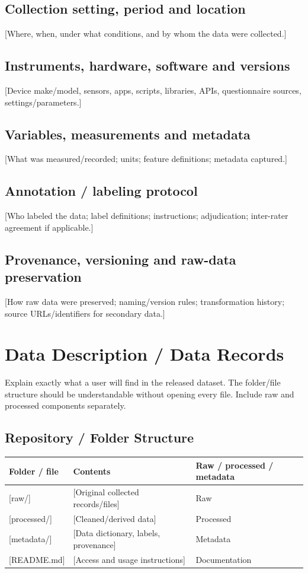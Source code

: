 \documentclass[11pt,a4paper]{article}
\begin{document}
\subsection{Collection setting, period and location}
[Where, when, under what conditions, and by whom the data were collected.]

\subsection{Instruments, hardware, software and versions}
[Device make/model, sensors, apps, scripts, libraries, APIs, questionnaire sources, settings/parameters.]

\subsection{Variables, measurements and metadata}
[What was measured/recorded; units; feature definitions; metadata captured.]

\subsection{Annotation / labeling protocol}
[Who labeled the data; label definitions; instructions; adjudication; inter-rater agreement if applicable.]

\subsection{Provenance, versioning and raw-data preservation}
[How raw data were preserved; naming/version rules; transformation history; source URLs/identifiers for secondary data.]

\vspace{1.5em}

\section{Data Description / Data Records}
Explain exactly what a user will find in the released dataset. The folder/file structure should be understandable without opening every file. Include raw and processed components separately.

\subsection{Repository / Folder Structure}
\noindent
\begin{tabularx}{\textwidth}{|p{3.5cm}|X|p{4.5cm}|}
\hline
\textbf{Folder / file} & \textbf{Contents} & \textbf{Raw / processed / metadata} \\
\hline
{[raw/]} & [Original collected records/files] & Raw \\
\hline
{[processed/]} & [Cleaned/derived data] & Processed \\
\hline
{[metadata/]} & [Data dictionary, labels, provenance] & Metadata \\
\hline
{[README.md]} & [Access and usage instructions] & Documentation \\
\hline
\end{tabularx}
\end{document}
